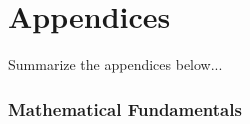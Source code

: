 
\part*{Appendices}

Summarize the appendices below...

\appendix


\toclineskip
\section{Mathematical Fundamentals}



